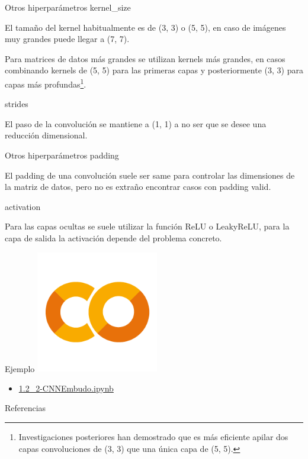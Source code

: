 \begin{frame}{Otros hiperparámetros}
\alert{\Large kernel\_size}

El tamaño del kernel \alert{habitualmente} es de \alert{(3, 3)} o \alert{(5, 5)}, en caso de imágenes muy grandes puede llegar a \alert{(7, 7)}.

Para matrices de datos \alert{más grandes} se utilizan \alert{kernels más grandes}, en casos combinando kernels de \alert{(5, 5)} para las \alert{primeras capas} y posteriormente \alert{(3, 3)} para capas más \alert{profundas}\footnote{Investigaciones posteriores \cite{simonyan2014very} han demostrado que es más eficiente apilar dos capas convoluciones de (3, 3) que una única capa de (5, 5).}.

\vfill
\alert{\Large strides}

El paso de la convolución se mantiene a \alert{(1, 1)} a no ser que se desee una \alert{reducción dimensional}.
\end{frame}

\begin{frame}{Otros hiperparámetros}
\alert{\Large padding}

El padding de una convolución suele ser \alert{same} para controlar las dimensiones de la matriz de datos, pero no es extraño encontrar casos con padding \alert{valid}.

\vfill
\alert{\Large activation}

Para las \alert{capas ocultas} se suele utilizar la función \alert{ReLU} o \alert{LeakyReLU}, para la capa de \alert{salida} la activación depende del \alert{problema concreto}.
\end{frame}

\begin{frame}{Ejemplo}
    \centering
    \includegraphics[width=0.4\textwidth]{figures/GoogleColab.png}
\begin{itemize}
    \centering
    \item {\Large \href{https://colab.research.google.com/drive/17QwnRs7P0bv6kYsbQPYIrIDjk-uL_9rd?usp=sharing}{1.2\_2-CNNEmbudo.ipynb}}
\end{itemize}
\end{frame}


\begin{frame}[allowframebreaks]{Referencias}
    
    
\end{frame}

